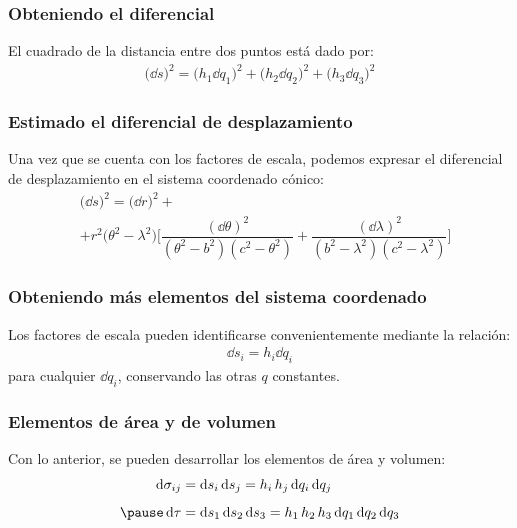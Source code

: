 \documentclass[12pt]{beamer}
\begin{document}
\begin{frame}
\frametitle{Obteniendo el diferencial}
El cuadrado de la distancia entre dos puntos está dado por:
\pause
\begin{align*}
\big( \dd{s} \big)^{2} = \big( h_{1} \dd{q_{1}} \big)^{2} + \big( h_{2} \dd{q_{2}} \big)^{2} + \big( h_{3} \dd{q_{3}} \big)^{2}
\end{align*}
\end{frame}
\begin{frame}
\frametitle{Estimado el diferencial de desplazamiento}
Una vez que se cuenta con los factores de escala, podemos expresar el diferencial de desplazamiento en el sistema coordenado cónico:
\pause
\begin{align*}
&\big( \dd{s} \big)^{2} = \big( \dd{r} \big)^{2} + \\[0.5em]
&+ r^{2} \big( \theta^{2} {-} \lambda^{2} \big) \bigg[ \dfrac{(\dd{\theta})^{2}}{(\theta^{2} {-} b^{2})(c^{2} {-} \theta^{2})} {+} \dfrac{(\dd{\lambda})^{2}}{(b^{2} {-} \lambda^{2})(c^{2} {-} \lambda^{2})} \bigg]
\end{align*}
\end{frame}
\begin{frame}
\frametitle{Obteniendo más elementos del sistema coordenado}
Los factores de escala pueden identificarse convenientemente mediante la relación:
\pause
\begin{align*}
\dd{s_{i}} = h_{i} \dd{q_{i}}
\end{align*}
para cualquier $\dd{q_{i}}$, conservando las otras $q$ constantes.
\end{frame}
\begin{frame}
\frametitle{Elementos de área y de volumen}
Con lo anterior, se pueden desarrollar los elementos de área y volumen:
\pause
\begin{eqnarray*}
\begin{aligned}
\dd{\sigma_{ij}} &= \dd{s_{i}} \dd{s_{j}} = h_{i} \, h_{j} \dd{q_{i}} \dd{q_{j}} \\[0.5em] \pause
\dd{\tau} &= \dd{s_{1}} \dd{s_{2}} \dd{s_{3}}= h_{1} \, h_{2} \, h_{3} \dd{q_{1}} \dd{q_{2}} \dd{q_{3}}
\end{aligned}
\end{eqnarray*}
\end{frame}

\end{document}
